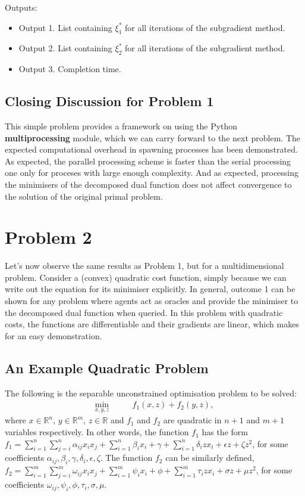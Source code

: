 \documentclass[12pt]{article}
\begin{document}
Outputs:
\begin{itemize}
	\item Output 1. List containing $\xi_1^*$ for all iterations of the subgradient method.
	\item Output 2. List containing $\xi_2^*$ for all iterations of the subgradient method.
	\item Output 3. Completion time.
\end{itemize}

\subsection*{Closing Discussion for Problem 1}

This simple problem provides a framework on using the Python \textbf{multiprocessing} module, which we can carry forward to the next problem. The expected computational overhead in spawning processes has been demonstrated. As expected, the parallel processing scheme is faster than the serial processing one only for proceses with large enough complexity. And as expected, processing the minimisers of the decomposed dual function does not affect convergence to the solution of the original primal problem.

\section*{Problem 2}

Let's now observe the same results as Problem 1, but for a multidimensional problem. Consider a (convex) quadratic cost function, simply because we can write out the equation for its minimiser explicitly. In general, outcome 1 can be shown for any problem where agents act as oracles and provide the minimiser to the decomposed dual function when queried. In this problem with quadratic costs, the functions are differentiable and their gradients are linear, which makes for an easy demonstration.

\subsection*{An Example Quadratic Problem}

The following is the separable unconstrained optimisation problem to be solved:
\begin{align*}
\min_{x,y,z}\qquad& f_1(x,z)+f_2(y,z),
\end{align*}
where $x\in\mathbb{R}^n$, $y\in\mathbb{R}^m$, $z\in\mathbb{R}$ and $f_1$ and $f_2$ are quadratic in $n+1$ and $m+1$ variables respectively. In other words, the function $f_1$ has the form $f_1=\sum\limits_{i=1}^n \sum\limits_{j=i}^n \alpha_{ij}x_ix_j + \sum\limits_{i=1}^n \beta_ix_i+\gamma+\sum\limits_{i=1}^n \delta_izx_i+\epsilon z+\zeta z^2$, for some coefficients $\alpha_{ij},\beta_i,\gamma,\delta_i,\epsilon,\zeta$. The function $f_2$ can be similarly defined, $f_2=\sum\limits_{i=1}^m \sum\limits_{j=i}^m \omega_{ij}x_ix_j + \sum\limits_{i=1}^m \psi_ix_i+\phi+\sum\limits_{i=1}^m \tau_izx_i+\sigma z+\mu z^2$, for some coefficients $\omega_{ij},\psi_i,\phi,\tau_i,\sigma,\mu$.
\end{document}

